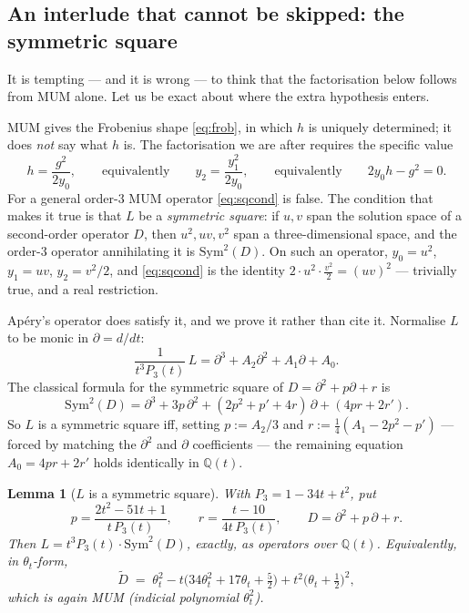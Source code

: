 \documentclass[11pt,reqno]{amsart}
\theoremstyle{plain}
\newtheorem{lemma}[theorem]{Lemma}
\theoremstyle{definition}
\theoremstyle{remark}
\newcommand{\Q}{\mathbb{Q}}
\newcommand{\ta}{\theta_t}
\numberwithin{equation}{section}
\begin{document}
\subsection*{An interlude that cannot be skipped: the symmetric square}

It is tempting --- and it is wrong --- to think that the factorisation below
follows from MUM alone. Let us be exact about where the extra hypothesis
enters.

MUM gives the Frobenius shape \eqref{eq:frob}, in which $h$ is uniquely
determined; it does \emph{not} say what $h$ is. The factorisation we are after
requires the specific value
\begin{equation}\label{eq:sqcond}
  h=\frac{g^{2}}{2y_0},
  \qquad\text{equivalently}\qquad
  y_2=\frac{y_1^{2}}{2y_0},
  \qquad\text{equivalently}\qquad
  2y_0h-g^{2}=0 .
\end{equation}
For a general order-$3$ MUM operator \eqref{eq:sqcond} is false. The condition
that makes it true is that $L$ be a \emph{symmetric square}: if $u,v$ span the
solution space of a second-order operator $D$, then $u^2,uv,v^2$ span a
three-dimensional space, and the order-$3$ operator annihilating it is
$\mathrm{Sym}^2(D)$. On such an operator, $y_0=u^2$, $y_1=uv$, $y_2=v^2/2$, and
\eqref{eq:sqcond} is the identity $2\cdot u^2\cdot\tfrac{v^2}{2}=(uv)^2$ ---
trivially true, and a real restriction.

Ap\'ery's operator does satisfy it, and we prove it rather than cite it.
Normalise $L$ to be monic in $\partial=d/dt$:
\[
  \frac{1}{t^3P_3(t)}\,L=\partial^3+A_2\partial^2+A_1\partial+A_0 .
\]
The classical formula for the symmetric square of $D=\partial^2+p\partial+r$ is
\begin{equation}\label{eq:sym2}
  \mathrm{Sym}^2(D)=\partial^3+3p\,\partial^2+(2p^2+p'+4r)\,\partial
                    +(4pr+2r') .
\end{equation}
So $L$ is a symmetric square iff, setting $p:=A_2/3$ and
$r:=\tfrac14(A_1-2p^2-p')$ --- forced by matching the $\partial^2$ and
$\partial$ coefficients --- the remaining equation $A_0=4pr+2r'$ holds
identically in $\Q(t)$.

\begin{lemma}[$L$ is a symmetric square]\label{lem:sym2}
With $P_3=1-34t+t^2$, put
\[
  p=\frac{2t^2-51t+1}{t\,P_3(t)},\qquad
  r=\frac{t-10}{4t\,P_3(t)},\qquad D=\partial^2+p\,\partial+r .
\]
Then $L=t^3P_3(t)\cdot\mathrm{Sym}^2(D)$, exactly, as operators over $\Q(t)$.
Equivalently, in $\ta$-form,
\begin{equation}\label{eq:Dtheta}
  \widetilde D\;=\;\ta^{2}-t\bigl(34\ta^{2}+17\ta+\tfrac52\bigr)
                   +t^{2}\bigl(\ta+\tfrac12\bigr)^{2},
\end{equation}
which is again MUM (indicial polynomial $\ta^2$).
\end{lemma}
\end{document}
